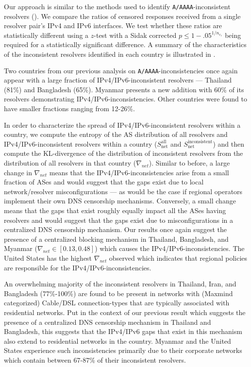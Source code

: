  Our approach is similar to
the methods used to identify {\tt A/AAAA}-inconsistent resolvers
(\cf {}). 
%
We compare the ratios of censored responses received from a single resolver
pair's IPv4 and IPv6 interfaces. We test whether these ratios are statistically
different using a $z$-test with a Sidak corrected $p \leq 1-.05^{1/n_{r_c}}$
being required for a statistically significant difference. 
%
A summary of the characteristics of the inconsistent resolvers identified in
each country is illustrated in .

%
Two countries from our previous analysis on {\tt A/AAAA}-inconsistencies once
again appear with a large fraction of IPv4/IPv6-inconsistent resolvers ---
Thailand (81\%) and Bangladesh (65\%). Myanmar presents a new addition with
60\% of its resolvers demonstrating IPv4/IPv6-inconsistencies. Other countries
were found to have smaller fractions ranging from 12-26\%.

%
In order to characterize the spread of IPv4/IPv6-inconsistent resolvers within
a country, we compute the entropy of the AS distribution of all resolvers and
IPv4/IPv6-inconsistent resolvers within a country
($S^{\text{all}}_{\text{net}}$ and $S^{\text{inconsistent}}_{\text{net}}$) and
then compute the KL-divergence of the distribution of inconsistent resolvers
from the distribution of all resolvers in that country ($\nabla_{net}$).
%
Similar to before, a large change in $\nabla_{net}$ means that the
IPv4/IPv6-inconsistencies arise from a small fraction of ASes and would suggest
that the gaps exist due to local network/resolver misconfigurations --- as
would be the case if regional operators implement their own DNS censorship
mechanisms. Conversely, a small change means that the gaps that exist roughly
equally impact all the ASes having resolvers and would suggest that the gaps
exist due to misconfigurations in a centralized DNS censorship mechanism.
%
Our results once again suggest the presence of a centralized blocking mechanism
in Thailand, Bangladesh, and Myanmar ($\nabla_{net} \in [0.13, 0.48]$) which
causes the IPv4/IPv6-inconsistencies. The United States has the highest
$\nabla_{net}$ observed which indicates that regional policies are responsible
for the IPv4/IPv6-inconsistencies. 

%
An overwhelming majority of the inconsistent resolvers in Thailand, Iran, and
Bangladesh (77\%-100\%) are found to be present in networks with (Maxmind
categorized) Cable/DSL connection-types that are typically associated with
residential networks. 
%
Put in the context of our previous result which suggests the presence of
a centralized DNS censorship mechanism in Thailand and Bangladesh, this
suggests that the IPv4/IPv6 gaps that exist in this mechanism also extend to
residential networks in the country.
%
Myanmar and the United States experience such inconsistencies primarily due to
their corporate networks which contain between 67-87\% of their inconsistent
resolvers. 

